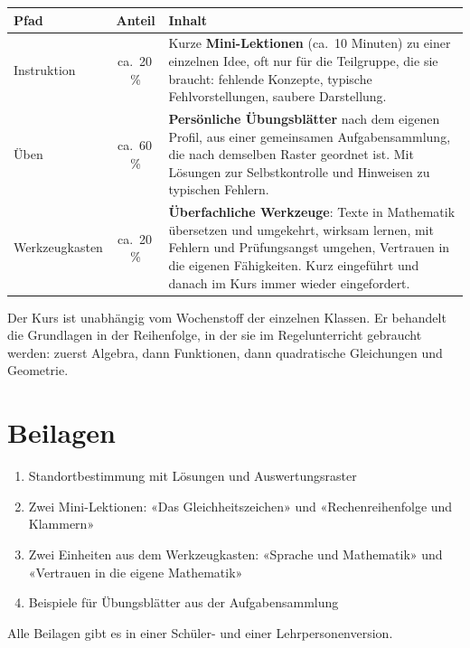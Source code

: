 \documentclass[11pt,a4paper]{article}
\begin{document}
\begin{tabularx}{\textwidth}{@{}>{\raggedright\arraybackslash}p{2.9cm}c X@{}}
  \toprule
  \textbf{Pfad} & \textbf{Anteil} & \textbf{Inhalt} \\
  \midrule
  Instruktion & ca.\ 20\,\% &
    Kurze \textbf{Mini-Lektionen} (ca.\ 10 Minuten) zu einer einzelnen
    Idee, oft nur für die Teilgruppe, die sie braucht: fehlende Konzepte,
    typische Fehlvorstellungen, saubere Darstellung. \\
  Üben & ca.\ 60\,\% &
    \textbf{Persönliche Übungsblätter} nach dem eigenen Profil, aus einer
    gemeinsamen Aufgabensammlung, die nach demselben Raster geordnet ist.
    Mit Lösungen zur Selbstkontrolle und Hinweisen zu typischen Fehlern. \\
  Werkzeugkasten & ca.\ 20\,\% &
    \textbf{Überfachliche Werkzeuge}: Texte in Mathematik übersetzen und
    umgekehrt, wirksam lernen, mit Fehlern und Prüfungsangst umgehen,
    Vertrauen in die eigenen Fähigkeiten. Kurz eingeführt und danach im
    Kurs immer wieder eingefordert. \\
  \bottomrule
\end{tabularx}

Der Kurs ist unabhängig vom Wochenstoff der einzelnen Klassen. Er behandelt
die Grundlagen in der Reihenfolge, in der sie im Regelunterricht gebraucht
werden: zuerst Algebra, dann Funktionen, dann quadratische Gleichungen und
Geometrie.

\section*{Beilagen}

\begin{enumerate}
  \item Standortbestimmung mit Lösungen und Auswertungsraster
  \item Zwei Mini-Lektionen: «Das Gleichheitszeichen» und
        «Rechenreihenfolge und Klammern»
  \item Zwei Einheiten aus dem Werkzeugkasten: «Sprache und Mathematik» und
        «Vertrauen in die eigene Mathematik»
  \item Beispiele für Übungsblätter aus der Aufgabensammlung
\end{enumerate}

Alle Beilagen gibt es in einer Schüler- und einer Lehrpersonenversion.
\end{document}
